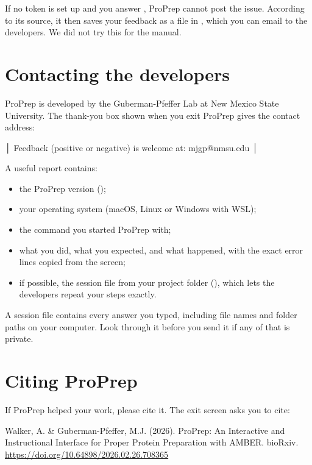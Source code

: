 If no token is set up and you answer , ProPrep cannot post the issue.
According to its source, it then saves your feedback as a file in
, which you can email to the developers. We did not
try this for the manual.

\section{Contacting the developers}\label{sec:help-contact}

ProPrep is developed by the Guberman-Pfeffer Lab at New Mexico State University.
The thank-you box shown when you exit ProPrep gives the contact address:

\begin{screen}
│ Feedback (positive or negative) is welcome at: mjgp@nmsu.edu           │
\end{screen}

A useful report contains:
\begin{itemize}
  \item the ProPrep version ();
  \item your operating system (macOS, Linux or Windows with WSL);
  \item the command you started ProPrep with;
  \item what you did, what you expected, and what happened, with the exact
  error lines copied from the screen;
  \item if possible, the session file from your project folder
  (), which lets the developers repeat
  your steps exactly.
\end{itemize}

\begin{tip}
A session file contains every answer you typed, including file names and
folder paths on your computer. Look through it before you send it if any of
that is private.
\end{tip}

\section{Citing ProPrep}\label{sec:help-cite}

If ProPrep helped your work, please cite it. The exit screen asks you to cite:

\begin{example}
Walker, A. \& Guberman-Pfeffer, M.J. (2026). ProPrep: An Interactive and
Instructional Interface for Proper Protein Preparation with AMBER. bioRxiv.
\url{https://doi.org/10.64898/2026.02.26.708365}
\end{example}

